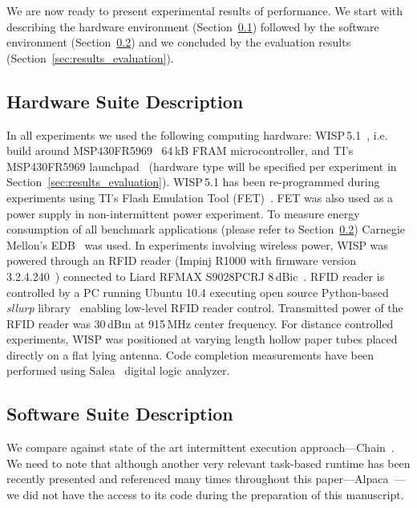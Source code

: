 We are now ready to present experimental results of \sys performance. We start with describing the hardware environment (Section~\ref{sec:results_hardware}) followed by the software environment (Section~\ref{sec:results_software}) and we concluded by the evaluation results (Section~\ref{sec:results_evaluation}).

\subsection{Hardware Suite Description}
\label{sec:results_hardware}

In all experiments we used the following computing hardware: WISP\,5.1~\cite{wisp5,wisp}, i.e. build around MSP430FR5969~\cite{wolverine} 64\,kB FRAM microcontroller, and TI's MSP430FR5969 launchpad~\cite{MSP-EXP430FR5969_launchpad} (hardware type will be specified per experiment in Section~\ref{sec:results_evaluation}). WISP\,5.1 has been re-programmed during experiments using TI's Flash Emulation Tool (FET)~\cite{fet}. FET was also used as a power supply in non-intermittent power experiment. To measure energy consumption of all benchmark applications (please refer to Section~\ref{sec:results_software}) Carnegie Mellon's EDB~\cite{edb} was used. In experiments involving wireless power, WISP was powered through an RFID reader (Impinj R1000 with firmware version 3.2.4.240~\cite{r1000_data_sheet}) connected to Liard RFMAX S9028PCRJ 8\,dBic~\cite{atlas2015}. RFID reader is controlled by a PC running Ubuntu 10.4 executing open source Python-based \emph{sllurp} library~\cite{sllrp_github} enabling low-level RFID reader control. Transmitted power of the RFID reader was 30\,dBm at 915\,MHz center frequency. For distance controlled experiments, WISP was positioned at varying length hollow paper tubes placed directly on a flat lying antenna. Code completion measurements have been performed using Salea~\cite{saleae} digital logic analyzer.

\subsection{Software Suite Description}
\label{sec:results_software}

We compare \sys against state of the art intermittent execution approach---Chain~\cite{chain}. We need to note that although another very relevant task-based runtime has been recently presented and referenced many times throughout this paper---Alpaca~\cite{alpaca}---we did not have the access to its code during the preparation of this manuscript. 

